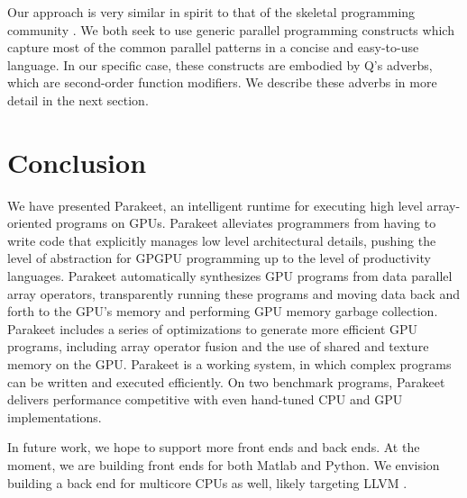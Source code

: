 \documentclass[preprint]{sigplanconf}
\begin{document}
Our approach is very similar in spirit to that of the skeletal programming
community \cite{Cole04}.  We both seek to use generic parallel programming
constructs which capture most of the common parallel patterns in a concise and
easy-to-use language.  In our specific case, these constructs are embodied by
Q's adverbs, which are second-order function modifiers.  We describe these
adverbs in more detail in the next section.

\section{Conclusion}
\label{Conclusion}

We have presented Parakeet, an intelligent runtime for executing high level
array-oriented programs on GPUs.  Parakeet alleviates programmers from having
to write code that explicitly manages low level architectural details, pushing
the level of abstraction for GPGPU programming up to the level of productivity
languages.  Parakeet automatically synthesizes GPU programs from data parallel
array operators, transparently running these programs and moving data back and
forth to the GPU's memory and performing GPU memory garbage collection.
Parakeet includes a series of optimizations to generate more efficient GPU
programs, including array operator fusion and the use of shared and texture
memory on the GPU.  Parakeet is a working system, in which complex programs can
be written and executed efficiently.  On two benchmark programs, Parakeet
delivers performance competitive with even hand-tuned CPU and GPU
implementations.

In future work, we hope to support more front ends and back ends.  At the
moment, we are building front ends for both Matlab and Python.  We envision
building a back end for multicore CPUs as well, likely targeting LLVM
\cite{Latt02}.


{}
\end{document}
